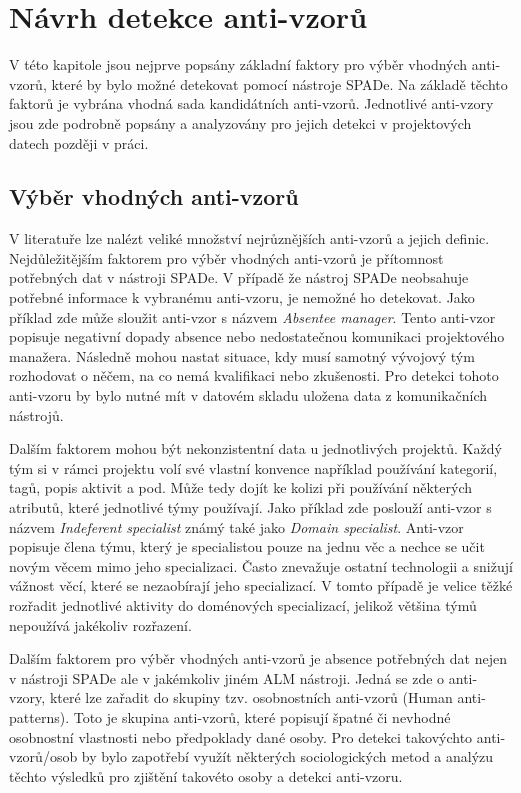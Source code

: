 \documentclass[czech,DP]{thesiskiv}
\begin{document}
\chapter{Návrh detekce anti-vzorů}\label{sec:analyze_detection}
V této kapitole jsou nejprve popsány základní faktory pro výběr vhodných anti-vzorů, které by bylo možné detekovat pomocí nástroje SPADe. Na základě těchto faktorů je vybrána vhodná sada kandidátních anti-vzorů. Jednotlivé anti-vzory jsou zde podrobně popsány a analyzovány pro jejich detekci v projektových datech později v práci.
\section{Výběr vhodných anti-vzorů}
V literatuře lze nalézt veliké množství nejrůznějších anti-vzorů a jejich definic. Nejdůležitějším faktorem pro výběr vhodných anti-vzorů je přítomnost potřebných dat v nástroji SPADe. V případě že nástroj SPADe neobsahuje potřebné informace k vybranému anti-vzoru, je nemožné ho detekovat. Jako příklad zde může sloužit anti-vzor s názvem \textit{Absentee manager}. Tento anti-vzor popisuje negativní dopady absence nebo nedostatečnou komunikaci projektového manažera. Následně mohou nastat situace, kdy musí samotný vývojový tým rozhodovat o něčem, na co nemá kvalifikaci nebo zkušenosti. \cite{antipatterns} Pro detekci tohoto anti-vzoru by bylo nutné mít v datovém skladu uložena data z komunikačních nástrojů.
\par
Dalším faktorem mohou být nekonzistentní data u jednotlivých projektů. Každý tým si v rámci projektu volí své vlastní konvence například používání kategorií, tagů, popis aktivit a pod. Může tedy dojít ke kolizi při používání některých atributů, které jednotlivé týmy používají. Jako příklad zde poslouží anti-vzor s názvem \textit{Indeferent specialist} známý také jako \textit{Domain specialist}. Anti-vzor popisuje člena týmu, který je specialistou pouze na jednu věc a nechce se učit novým věcem mimo jeho specializaci. Často znevažuje ostatní technologii a snižují vážnost věcí, které se nezaobírají jeho specializací. \cite{indiferent_specialist} V tomto případě je velice těžké rozřadit jednotlivé aktivity do doménových specializací, jelikož většina týmů nepoužívá jakékoliv rozřazení.
\par
Dalším faktorem pro výběr vhodných anti-vzorů je absence potřebných dat nejen v nástroji SPADe ale v jakémkoliv jiném ALM nástroji. Jedná se zde o anti-vzory, které lze zařadit do skupiny tzv. osobnostních anti-vzorů (Human anti-patterns). Toto je skupina anti-vzorů, které popisují špatné či nevhodné osobnostní vlastnosti nebo předpoklady dané osoby.\cite{antipatterns} Pro detekci takovýchto anti-vzorů/osob by bylo zapotřebí využít některých sociologických metod a analýzu těchto výsledků pro zjištění takovéto osoby a detekci anti-vzoru.
\end{document}
